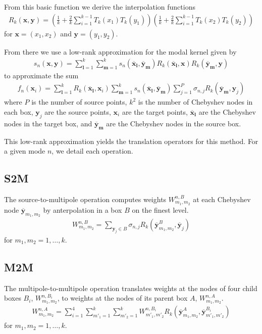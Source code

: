 \documentclass[11pt, oneside]{article}   	%
\begin{document}
From this basic function we derive the interpolation functions
\begin{align}
R_k(\mathbf{x},\mathbf{y}) = (\frac{1}{k} + \frac{2}{k}\sum_{i=1}^{k-1}T_k(x_1)T_k(y_1))(\frac{1}{k} + \frac{2}{k}\sum_{i=1}^{k-1}T_k(x_2)T_k(y_2))
\end{align}
for $\mathbf{x}=(x_1,x_2)$ and $\mathbf{y}=(y_1,y_2)$.

From there we use a low-rank approximation for the modal kernel given by
\begin{align}
s_n(\mathbf{x},\mathbf{y}) = \sum_{\mathbf{l}=1}^k\sum_{\mathbf{m}=1}^k s_n(\mathbf{\overline{x}}_{\mathbf{l}},\mathbf{\overline{y}}_{\mathbf{m}})R_k(\mathbf{\overline{x}}_{\mathbf{l}},\mathbf{x})R_k(\mathbf{\overline{y}}_{\mathbf{m}},\mathbf{y})
\end{align}
to approximate the sum
\begin{align}
f_n(\mathbf{x}_i)=\sum_{\mathbf{l}=1}^k R_k(\mathbf{\overline{x}}_{\mathbf{l}},\mathbf{x}_i) \sum_{\mathbf{m}=1}^k s_n(\mathbf{\overline{x}}_{\mathbf{l}},\mathbf{\overline{y}}_{\mathbf{m}}) \sum_{j=1}^P \sigma_{n,j}R_k(\mathbf{\overline{y}}_{\mathbf{m}},\mathbf{y}_j)
\end{align}
where $P$ is the number of source points, $k^2$ is the number of Chebyshev nodes in each box, $\mathbf{y}_j$ are the source points, $\mathbf{x}_i$ are the target points, $\mathbf{\overline{x}}_{\mathbf{l}}$ are the Chebyshev nodes in the target box, and $\mathbf{\overline{y}}_{\mathbf{m}}$ are the Chebyshev nodes in the source box.

This low-rank approximation yields the translation operators for this method. For a given mode $n$, we detail each operation.
\subsection{S2M}
The source-to-multipole operation computes weights $W^{n,B}_{m_1,m_2}$ at each Chebyshev node $\mathbf{\overline{y}}_{m_1,m_2}$ by anterpolation in a box $B$ on the finest level.
\begin{align}
W_{m_1,m_2}^{n,B} = \sum_{\mathbf{y}_j\in B} \sigma_{n,j} R_k(\mathbf{\overline{y}}^B_{m_1,m_2},\mathbf{\overline{y}}_j)
\end{align}
for $m_1,m_2 = 1,\dots,k$.
\subsection{M2M}
The multipole-to-multipole operation translates weights at the nodes of four child boxes $B_i$, $W_{m_1,m_2}^{n,B_i}$, to weights at the nodes of its parent box $A$, $W_{m_1,m_2}^{n,A}$.
\begin{align}
W_{m_1,m_2}^{n,A} = \sum_{i=1}^4 \sum_{m'_1=1}^k\sum_{m'_2=1}^k W_{m'_1,m'_2}^{n,B_i} R_k(\mathbf{\overline{y}}^A_{m_1,m_2},\mathbf{\overline{y}}^{B_i}_{m'_1,m'_2})
\end{align}
for $m_1,m_2= 1,\dots,k$.
\end{document}
